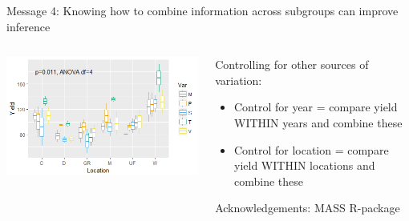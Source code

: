 \documentclass[10pt]{beamer}
\begin{document}
\begin{frame}{Message 4: Knowing how to combine information across subgroups  can improve inference}
 
  \begin{columns}
    \begin{column}{0.5\textwidth}
	\begin{center}
	\includegraphics[width=\textwidth]{Figures/message4d}
	\end{center}
    \end{column}
    
    \begin{column}{0.5\textwidth}
    \begin{block}{Controlling for other sources of variation:}
      \begin{itemize}
	\item Control for year = compare yield WITHIN years and combine these
	\item Control for location = compare yield WITHIN locations and combine these
      \end{itemize}
      \end{block}
      \tiny Acknowledgements: MASS R-package
    \end{column}
  \end{columns}
   
\end{frame}
\end{document}
